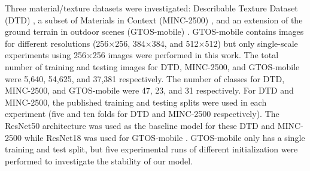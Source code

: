 \documentclass[journal]{IEEEtai}
\begin{document}
	Three material/texture datasets were investigated: Describable Texture Dataset (DTD) \cite{cimpoi14describing}, a subset of Materials in Context (MINC-2500) \cite{bell2015material}, and an extension of the ground terrain in outdoor scenes (GTOS-mobile) \cite{xue2018deep}. GTOS-mobile contains images for different resolutions (256$\times$256, 384$\times$384, and 512$\times$512) but only single-scale experiments using 256$\times$256 images were performed in this work. The total number of training and testing images for DTD, MINC-2500, and GTOS-mobile were 5,640, 54,625, and 37,381 respectively. The number of classes for DTD, MINC-2500, and GTOS-mobile were 47, 23, and 31 respectively. For DTD and MINC-2500, the published training and testing splits were used in each experiment (five and ten folds for DTD and MINC-2500 respectively). The ResNet50 architecture was used as the baseline model for these DTD and MINC-2500 while ResNet18 was used for GTOS-mobile \cite{xue2018deep}. GTOS-mobile only has a single training and test split, but five experimental runs of different initialization were performed to investigate the stability of our model. 
\end{document}
